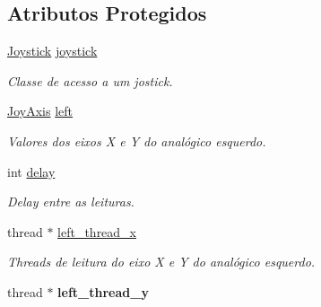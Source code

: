 \subsection*{Atributos Protegidos}
\begin{DoxyCompactItemize}
\item 
\hyperlink{classJoystick}{Joystick} \hyperlink{classReaderControlJoy_a4504d5b41d99872f8b70b6fc128ef59a}{joystick}\hypertarget{classReaderControlJoy_a4504d5b41d99872f8b70b6fc128ef59a}{}\label{classReaderControlJoy_a4504d5b41d99872f8b70b6fc128ef59a}

\begin{DoxyCompactList}\small\item\em Classe de acesso a um jostick. \end{DoxyCompactList}\item 
\hyperlink{structJoyAxis}{Joy\+Axis} \hyperlink{classReaderControlJoy_a414a8cb6d2eb114839ee97f3a88923c6}{left}\hypertarget{classReaderControlJoy_a414a8cb6d2eb114839ee97f3a88923c6}{}\label{classReaderControlJoy_a414a8cb6d2eb114839ee97f3a88923c6}

\begin{DoxyCompactList}\small\item\em Valores dos eixos X e Y do analógico esquerdo. \end{DoxyCompactList}\item 
int \hyperlink{classReaderControlJoy_a5fc5159efb202046ba274921c1428859}{delay}\hypertarget{classReaderControlJoy_a5fc5159efb202046ba274921c1428859}{}\label{classReaderControlJoy_a5fc5159efb202046ba274921c1428859}

\begin{DoxyCompactList}\small\item\em Delay entre as leituras. \end{DoxyCompactList}\item 
thread $\ast$ \hyperlink{classReaderControlJoy_ad1f9eb4e3eec25ec9356e8923c23c0b8}{left\+\_\+thread\+\_\+x}\hypertarget{classReaderControlJoy_ad1f9eb4e3eec25ec9356e8923c23c0b8}{}\label{classReaderControlJoy_ad1f9eb4e3eec25ec9356e8923c23c0b8}

\begin{DoxyCompactList}\small\item\em Threads de leitura do eixo X e Y do analógico esquerdo. \end{DoxyCompactList}\item 
thread $\ast$ {\bfseries left\+\_\+thread\+\_\+y}\hypertarget{classReaderControlJoy_adcdbfb32aab9f901bf94db676a19ec02}{}\label{classReaderControlJoy_adcdbfb32aab9f901bf94db676a19ec02}

\end{DoxyCompactItemize}


